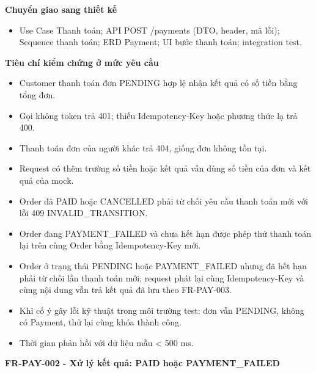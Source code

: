 \documentclass[11pt,a4paper,oneside]{report}
\begin{document}
\textbf{Chuyển giao sang thiết kế}

\begin{itemize}
\item
  Use Case Thanh toán; API POST /payments (DTO, header, mã lỗi); Sequence thanh toán; ERD Payment; UI bước thanh toán; integration test.
\end{itemize}

\textbf{Tiêu chí kiểm chứng ở mức yêu cầu}

\begin{itemize}
\item
  Customer thanh toán đơn PENDING hợp lệ nhận kết quả có số tiền bằng tổng đơn.
\item
  Gọi không token trả 401; thiếu Idempotency-Key hoặc phương thức lạ trả 400.
\item
  Thanh toán đơn của người khác trả 404, giống đơn không tồn tại.
\item
  Request có thêm trường số tiền hoặc kết quả vẫn dùng số tiền của đơn và kết quả của mock.
\item
  Order đã PAID hoặc CANCELLED phải từ chối yêu cầu thanh toán mới với lỗi 409 INVALID\_TRANSITION.
\item
  Order đang PAYMENT\_FAILED và chưa hết hạn được phép thử thanh toán lại trên cùng Order bằng Idempotency-Key mới.
\item
  Order ở trạng thái PENDING hoặc PAYMENT\_FAILED nhưng đã hết hạn phải từ chối lần thanh toán mới; request phát lại cùng Idempotency-Key và cùng nội dung vẫn trả kết quả đã lưu theo FR-PAY-003.
\item
  Khi cố ý gây lỗi kỹ thuật trong môi trường test: đơn vẫn PENDING, không có Payment, thử lại cùng khóa thành công.
\item
  Thời gian phản hồi với dữ liệu mẫu \textless{} 500 ms.
\end{itemize}

\textbf{FR-PAY-002 - Xử lý kết quả: PAID hoặc PAYMENT\_FAILED}
\end{document}
